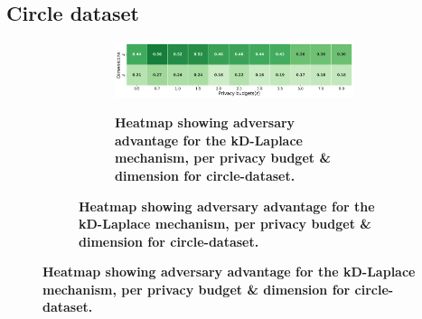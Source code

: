 \newpage
\subsection{Circle dataset}
\begin{figure}[H]
      \centering
      \begin{subfigure}[b]{0.85\textwidth}
            \begin{subfigure}[c]{1\textwidth}
                  \caption{\textbf{Heatmap showing adversary advantage for the kD-Laplace mechanism, per privacy budget \& dimension for circle-dataset.}}
                  \includegraphics[width=1\textwidth]{Results/kd-laplace/kd-Laplace/circle-dataset/shokri_mi_adv.png}
                  \label{fig:privacy_circle-dataset_adversial_advantage_kd-laplace}
            \end{subfigure}
            \vfill %


\end{subfigure}
\end{figure}
